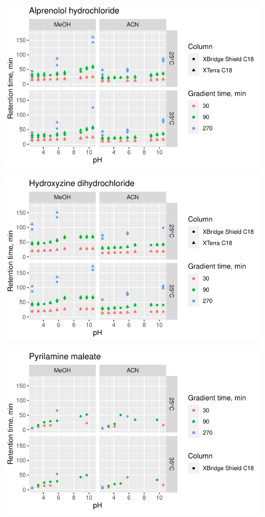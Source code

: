 \documentclass[
  letterpaper,
  DIV=11,
  numbers=noendperiod]{scrreprt}
\begin{document}
\includegraphics{index_files/figure-pdf/unnamed-chunk-4-87.pdf}

\includegraphics{index_files/figure-pdf/unnamed-chunk-4-88.pdf}

\includegraphics{index_files/figure-pdf/unnamed-chunk-4-89.pdf}
\end{document}
